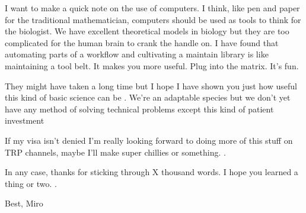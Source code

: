 I want to make a quick note on the use of computers. I think, like pen and paper for the traditional mathematician, computers should be used as tools to think for the biologist. We have excellent theoretical models in biology but they are too complicated for the human brain to crank the handle on. I have found that automating parts of a workflow and cultivating a maintain library is like maintaining a tool belt. It makes you more useful. Plug into the matrix. It's fun.

They might have taken a long time but I hope I have shown you just how useful this kind of basic science can be . We're an adaptable species but we don't yet have any method of solving technical problems except this kind of patient investment

If my visa isn't denied I'm really looking forward to doing more of this stuff on TRP channels, maybe I'll make super chillies or something. .

In any case, thanks for sticking through X thousand words. I hope you learned a thing or two. .

Best, Miro
